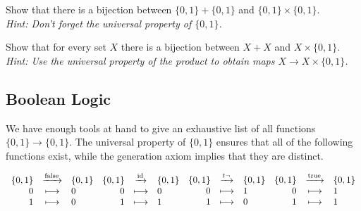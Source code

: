 \documentclass{article}
\DeclareMathOperator{\true}{true}
\DeclareMathOperator{\false}{false}
\begin{document}
	\begin{exercise}
		\label{excTwoPlusTwoIsTwoTimesTwo}
		Show that there is a bijection between $\{0,1\}+\{0,1\}$ and $\{0,1\}\times\{0,1\}$. \\
		\textit{Hint: Don't forget the universal property of $\{0,1\}$.}
	\end{exercise}
	\begin{exercise2}
		Show that for every set $X$ there is a bijection between $X+X$ and $X\times\{0,1\}$.\\
		\textit{Hint: Use the universal property of the product to obtain maps $X\rightarrow X\times\{0,1\}$.}
	\end{exercise2}

	\newpage
	\subsection{Boolean Logic}


	We have enough tools at hand to give an exhaustive list of all functions $\{0,1\} \rightarrow \{0,1\}$. The universal property of $\{0,1\}$ ensures that all of the following functions exist, while the generation axiom implies that they are distinct.

	\begin{equation*}
		\begin{array}{rcl}
			\{0,1\} & \xrightarrow{\false} & \{0,1\}\\
			0 & \longmapsto & 0\\
			1 & \longmapsto & 0
		\end{array}
		\begin{array}{rcl}
			\{0,1\} & \xrightarrow{\id} & \{0,1\}\\
			0 & \longmapsto & 0\\
			1 & \longmapsto & 1
		\end{array}
		\begin{array}{rcl}
			\{0,1\} & \xrightarrow{t\lnot} & \{0,1\}\\
			0 & \longmapsto & 1\\
			1 & \longmapsto & 0
		\end{array}
		\begin{array}{rcl}
			\{0,1\} & \xrightarrow{\true} & \{0,1\}\\
			0 & \longmapsto & 1\\
			1 & \longmapsto & 1
		\end{array}
	\end{equation*}
\end{document}
